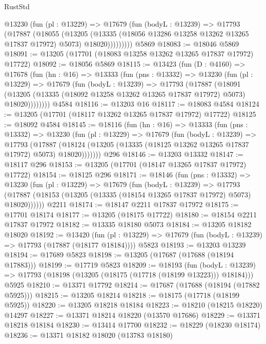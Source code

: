 \begin{lexlean}{RustStd}
\begin{coremodule}
          @13230
            (fun (pl : @13229) =>
            @17679
              (fun (bodyL : @13239) =>
              @17793
                (@17887
                  (@18055
                    (@13205
                      (@13335 (@18056 @13286 @13258 @13262 @13265 @17837 @17972) @5073)
                      @18020)))))))))
    @5869
@18083 := @18046 @5869
@18091 := @13205 (@17701 (@18083 @13258 @13262 @13265 @17837 @17972) @17722)
@18092 := @18056 @5869
@18115 := @13423
    (fun (D : @4160) =>
    @17678
      (fun (hn : @16) =>
      @13333
        (fun (pns : @13332) =>
        @13230
          (fun (pl : @13229) =>
          @17679
            (fun (bodyL : @13239) =>
            @17793
              (@17887
                (@18091
                  (@13205 (@13335 (@18092 @13258 @13262 @13265 @17837 @17972) @5073) @18020))))))))
    @4584
@18116 := @13203 @16
@18117 := @18083 @4584
@18124 := @13205 (@17701 (@18117 @13262 @13265 @17837 @17972) @17722)
@18125 := @18092 @4584
@18145 := @18116
    (fun (hn : @16) =>
    @13333
      (fun (pns : @13332) =>
      @13230
        (fun (pl : @13229) =>
        @17679
          (fun (bodyL : @13239) =>
          @17793
            (@17887
              (@18124 (@13205 (@13335 (@18125 @13262 @13265 @17837 @17972) @5073) @18020)))))))
    @296
@18146 := @13203 @13332
@18147 := @18117 @296
@18153 := @13205 (@17701 (@18147 @13265 @17837 @17972) @17722)
@18154 := @18125 @296
@18171 := @18146
    (fun (pns : @13332) =>
    @13230
      (fun (pl : @13229) =>
      @17679
        (fun (bodyL : @13239) =>
        @17793 (@17887 (@18153 (@13205 (@13335 (@18154 @13265 @17837 @17972) @5073) @18020))))))
    @2211
@18174 := @18147 @2211 @17837 @17972
@18175 := @17701 @18174
@18177 := @13205 (@18175 @17722)
@18180 := @18154 @2211 @17837 @17972
@18182 := @13335 @18180 @5073
@18184 := @13205 @18182 @18020
@18192 := @13420
    (fun (pl : @13229) => @17679 (fun (bodyL : @13239) => @17793 (@17887 (@18177 @18184))))
    @5823
@18193 := @13203 @13239
@18194 := @17689 @5823
@18198 := @13205 (@17687 (@17688 (@18194 @17883)))
@18199 := @17719 @5823
@18209 := @18193
    (fun (bodyL : @13239) => @17793 (@18198 (@13205 (@18175 (@17718 (@18199 @13223))) @18184)))
    @5925
@18210 := @13371 @17792
@18214 := @17687 (@17688 (@18194 (@17882 @5925)))
@18215 := @13205 @18214
@18218 := @18175 (@17718 (@18199 @5925))
@18220 := @13205 @18218 @18184
@18223 := @18210 (@18215 @18220) @14297
@18227 := @13371 @18214 @18220 (@13570 @17686)
@18229 := @13371 @18218 @18184
@18230 := @13414 @17700
@18232 := @18229 (@18230 @18174)
@18236 := @13371 @18182 @18020 (@13783 @18180)

\end{coremodule}
\end{lexlean}
